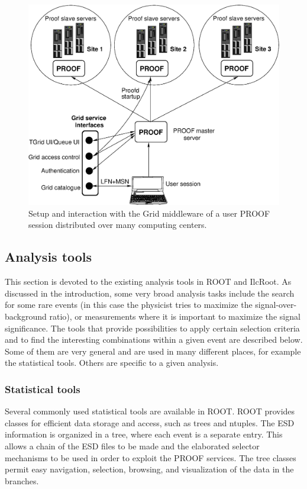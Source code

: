 \documentclass[12pt,a4paper,twoside]{article}
\makeatletter
\newcommand {\grid} {Grid\@\xspace}
\newcommand {\ilcroot} {IlcRoot\@\xspace}
\newcommand {\ROOT} {ROOT\@\xspace}
\makeatother
\begin{document}
{\begin{figure}[t]
  \centering
  \includegraphics[width=11.5cm]{picts/alienfig7}
  \caption{Setup and interaction with the \grid middleware of a user 
    PROOF session distributed over many computing centers.} 
  \label{CH3Fig:alienfig7}
\end{figure}


\subsection{Analysis tools}

This section is devoted to the existing analysis tools in \ROOT and
\ilcroot. As discussed in the introduction, some very broad
analysis tasks include the search for some rare events (in this case the
physicist tries to maximize the signal-over-background ratio), or
measurements where it is important to maximize the signal
significance. The tools that provide possibilities to apply certain
selection criteria and to find the interesting combinations within
a given event are described below. Some of them are very general and are
used in many different places, for example the statistical
tools. Others are specific to a given analysis.

\subsubsection{Statistical tools}

Several commonly used statistical tools are available in
\ROOT\cite{ROOT}. \ROOT provides 
classes for efficient data storage and access, such as trees
and ntuples. The
ESD information is organized in a tree, where each event is a separate
entry. This allows a chain of the ESD files to be made and the
elaborated selector mechanisms to be used in order to exploit the PROOF
services. The tree classes
permit easy navigation, selection, browsing, and visualization of the
data in the branches. 

}
\end{document}

